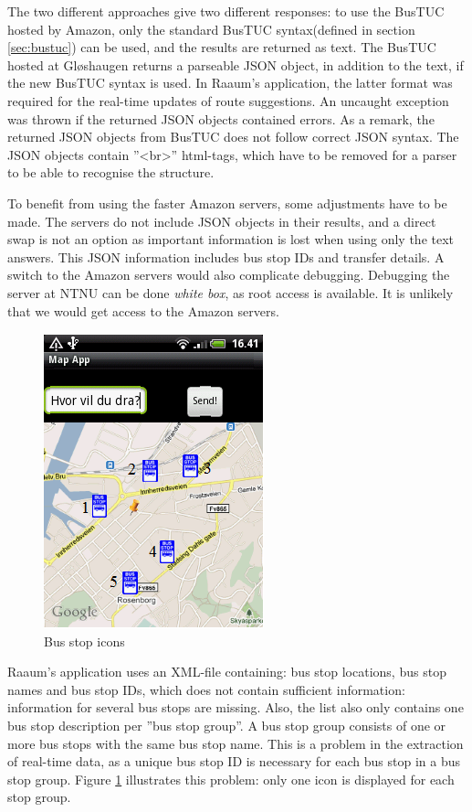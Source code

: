 The two different approaches give two different responses: to use the BusTUC hosted by Amazon, only the standard BusTUC syntax(defined in section \ref{sec:bustuc}) can be used, and the results are returned as text. The BusTUC hosted at Gl\o shaugen returns a parseable JSON object, in addition to the text, if the new BusTUC syntax is used. In Raaum's application, the latter format was required for the real-time updates of route suggestions. An uncaught exception was thrown if the returned JSON objects contained errors. As a remark, the returned JSON objects from BusTUC does not follow correct JSON syntax. The JSON objects contain ''<br>'' html-tags, which have to be removed for a parser to be able to recognise the structure. 


To benefit from using the faster Amazon servers, some adjustments have to be made. The servers do not include JSON objects in their results, and a direct swap is not an option as important information is lost when using only the text answers. This JSON information includes bus stop IDs and transfer details. A switch to the Amazon servers would also complicate debugging. Debugging the server at NTNU can be done \emph{white box}, as root access is available. It is unlikely that we would get access to the Amazon servers. 


\begin{figure}
  \begin{center}
    \includegraphics[scale=1]{TestingTheApplication/screen1.png}
  \end{center}
  \caption{Bus stop icons}
\label{fig:icons}
\end{figure}

Raaum's application uses an XML-file containing: bus stop locations, bus stop names and bus stop IDs, which does not contain sufficient information: information for several bus stops are missing. Also, the list also only contains one bus stop description per ''bus stop group''. A bus stop group consists of one or more bus stops with the same bus stop name. This is a problem in the extraction of real-time data, as a unique bus stop ID is necessary for each bus stop in a bus stop group. Figure \ref{fig:icons} illustrates this problem: only one icon is displayed for each stop group. 

